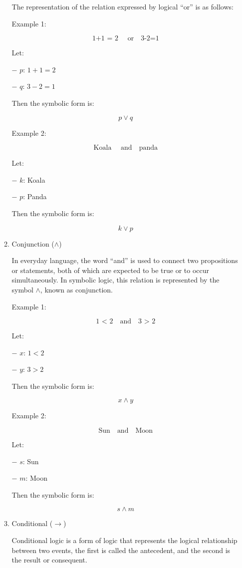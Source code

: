\begin{enumerate}
\begin{enumerate}
    The representation of the relation expressed by logical ``or'' is as
    follows:

    Example 1:

    \[ \text {1+1 = 2 } \quad \text{or} \quad \text{3-2=1} \]

    Let:

    − \(p\): \(1 + 1 = 2\)

    − \(q\): \(3 - 2 = 1\)

    Then the symbolic form is:

    \[
     p \lor q
     \]

    Example 2:

    \[ \text {Koala } \quad \text{and} \quad \text{panda} \]

    Let:

    − \(k\): Koala

    − \(p\): Panda

    Then the symbolic form is:

    \[
     k \lor p
     \]
  \item
    Conjunction (\(\land\))

    In everyday language, the word ``and'' is used to connect two
    propositions or statements, both of which are expected to be true or
    to occur simultaneously. In symbolic logic, this relation is
    represented by the symbol \(\land\), known as conjunction.

    Example 1:

    \[ \text {1 < 2} \quad \text{and} \quad \text{3 > 2} \]

    Let:

    − \(x\): \(1 < 2\)

    − \(y\): \(3 > 2\)

    Then the symbolic form is:

    \[
     x \land y
     \]

    Example 2:

    \[ \text {Sun} \quad \text{and} \quad \text{Moon} \]

    Let:

    − \(s\): Sun

    − \(m\): Moon

    Then the symbolic form is:

    \[
     s \land m
       \]
  \item
    Conditional (\(\rightarrow\))

    Conditional logic is a form of logic that represents the logical
    relationship between two events, the first is called the antecedent,
    and the second is the result or consequent.


\end{enumerate}
\end{enumerate}
